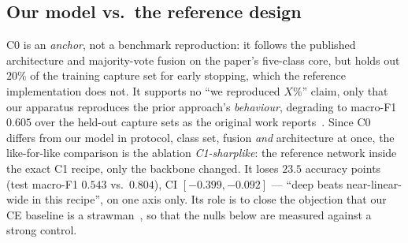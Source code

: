 \begin{table}[t]
\centering
\caption{Main results: validation macro-F1 (checkpoint selection; five-class,
not comparable to the test columns), test
macro-F1 and accuracy on the held-out session, and the paired accuracy
difference vs.\ C1 with its 95\% trace-level bootstrap CI ($\ast$ = interval
excludes zero). Top: primary rotation (leave-lab-out, 8 classes, 11 traces).
Bottom: second rotation (15 traces) and the 5-class SHARP anchor on its own
protocol (57 traces), neither comparable to the top block.}
\label{tab:test}
\end{table}

\subsection{Our model vs.\ the reference design}
\label{sec:res_baseline}

C0 is an \emph{anchor}, not a benchmark reproduction: it follows the published
architecture and majority-vote fusion on the paper's five-class core, but
holds out $20\%$ of the training capture set for early stopping, which the
reference implementation does not. It supports no ``we reproduced $X\%$''
claim, only that our apparatus reproduces the prior approach's
\emph{behaviour}, degrading to macro-F1 $0.605$ over the
held-out capture sets as the original work reports~\cite{Meneghello-2023}. Since C0 differs from
our model in protocol, class set, fusion \emph{and} architecture at once, the
like-for-like comparison is the ablation \emph{C1-sharplike}: the reference
network inside the exact C1 recipe, only the backbone changed. It loses $23.5$
accuracy points (test macro-F1 $0.543$ vs.\ $0.804$), CI $[-0.399,-0.092]$ ---
``deep beats near-linear-wide in this recipe'', on one axis only. Its role is
to close the objection that our CE baseline is a strawman~\cite{Gulrajani-2021},
so that the nulls below are measured against a strong control.

